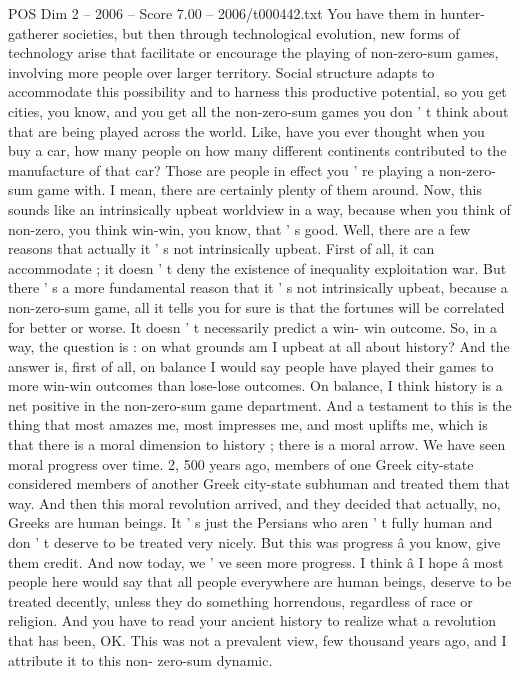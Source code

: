 \begin{textsample}{POS Dim 2 – 2006 – Score 7.00 – 2006/t000442.txt}
You have them in hunter-gatherer societies, but then through technological evolution, new forms of technology arise that facilitate or encourage the playing of non-zero-sum games, involving more people over larger territory.
Social structure adapts to accommodate this possibility and to harness this productive potential, so you get cities, you know, and you get all the non-zero-sum games you don ' t think about that are being played across the world.
Like, have you ever thought when you buy a car, how many people on how many different continents contributed to the manufacture of that car?
Those are people in effect you ' re playing a non-zero-sum game with.
I mean, there are certainly plenty of them around.
Now, this sounds like an intrinsically upbeat worldview in a way, because when you think of non-zero, you think win-win, you know, that ' s good.
Well, there are a few reasons that actually it ' s not intrinsically upbeat.
First of all, it can accommodate ; it doesn ' t deny the existence of inequality exploitation war.
But there ' s a more fundamental reason that it ' s not intrinsically upbeat, because a non-zero-sum game, all it tells you for sure is that the fortunes will be correlated for better or worse.
It doesn ' t necessarily predict a win- win outcome.
So, in a way, the question is : on what grounds am I upbeat at all about history?
And the answer is, first of all, on balance I would say people have played their games to more win-win outcomes than lose-lose outcomes.
On balance, I think history is a net positive in the non-zero-sum game department.
And a testament to this is the thing that most amazes me, most impresses me, and most uplifts me, which is that there is a moral dimension to history ; there is a moral arrow.
We have seen moral progress over time. 2, 500 years ago, members of one Greek city-state considered members of another Greek city-state subhuman and treated them that way.
And then this moral revolution arrived, and they decided that actually, no, Greeks are human beings.
It ' s just the Persians who aren ' t fully human and don ' t deserve to be treated very nicely.
But this was progress â you know, give them credit.
And now today, we ' ve seen more progress.
I think â I hope â most people here would say that all people everywhere are human beings, deserve to be treated decently, unless they do something horrendous, regardless of race or religion.
And you have to read your ancient history to realize what a revolution that has been, OK.
This was not a prevalent view, few thousand years ago, and I attribute it to this non- zero-sum dynamic.

\end{textsample}
